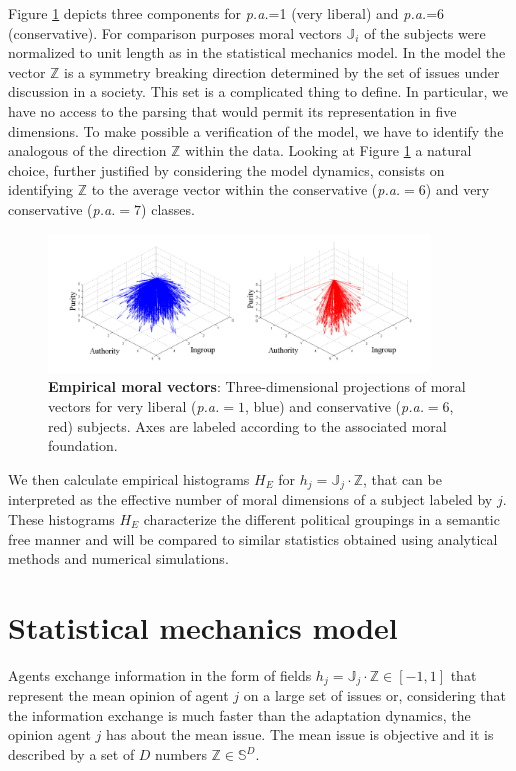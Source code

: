 \documentclass[twocolumn,showpacs]{revtex4-1}
\begin{document}
Figure \ref{fig:figmoral} depicts three components for {\it p.a.}=1 (very liberal) and {\it p.a.}=6 (conservative).  
For comparison purposes  
 moral vectors   $\mathbb{J}_i$ of the subjects were normalized to unit length as in the 
statistical mechanics model. In the model the vector $\mathbb{Z}$ is a symmetry breaking direction determined 
by the set of issues under discussion in a society.
This set is a complicated thing to define. In particular, we have no access to the
parsing that would permit its representation in five dimensions. To make possible a verification of the model,
 we have to identify the analogous of the direction $\mathbb{Z}$ within the data. Looking at Figure \ref{fig:figmoral} a natural choice, further justified by considering the model dynamics, 
consists on identifying $\mathbb{Z}$ to the average vector 
within the conservative ({\it p.a.}$=6$) and very conservative ({\it p.a.}$=7$) classes. 

\begin{widetext}
\begin{figure}[!htb]		
\centering\includegraphics[width=0.9\textwidth]{fig2_cones.pdf}
\centering \caption
 {{\bf Empirical moral vectors}: Three-dimensional projections of moral vectors for very liberal ({\it p.a.}$=1$, blue) 
and conservative ({\it p.a.}$=6$, red) subjects. Axes are labeled according to the associated moral foundation.}
\label{fig:figmoral}
\end{figure}
\end{widetext}

We then calculate  empirical histograms $H_E$ for   ${h_j}=\mathbb{J}_j\cdot\mathbb{Z}$, that can be interpreted as the  effective number of moral dimensions of a  subject labeled by $j$.
These histograms $H_E$ characterize the different political groupings 
in a semantic free manner and will be compared to similar statistics obtained using analytical methods and numerical simulations.



\section{Statistical mechanics model}
\label{sec:model} 
Agents exchange information in the form of fields $h_j=\mathbb{J}_j \cdot \mathbb{Z}\in[-1,1]$ that represent the mean opinion of 
agent $j$ on a large set of issues or, considering that the information exchange is much faster than the adaptation dynamics,
 the opinion agent $j$ has about the mean issue. The mean issue is objective and it is described by a set of $D$  
numbers $\mathbb{Z}\in \mathbb{S}^D$. 
\end{document}
